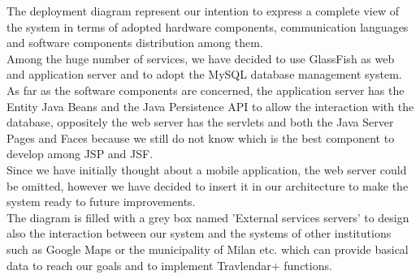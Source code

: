 The deployment diagram represent our intention to express a complete view of the system in terms of adopted hardware components, communication languages and  software components distribution among them. \\
Among the huge number of services, we have decided to use GlassFish as web and application server and to adopt the MySQL database management system. \\
As far as the software components are concerned, the application server has the Entity Java Beans and the Java Persistence API to allow the interaction with the database, oppositely the web server has the servlets and both the Java Server Pages and Faces because we still do not know which is the best component to develop among JSP and JSF.\\
Since we have initially thought about a mobile application, the web server could be omitted, however we have decided to insert it in our architecture to make the system ready to future improvements. \\ 
The diagram is filled with a grey box named 'External services servers' to design also the interaction between our system and the systems of other institutions such as Google Maps or the municipality of Milan etc. which can provide basical data to reach our goals and to implement Travlendar+ functions.\\


